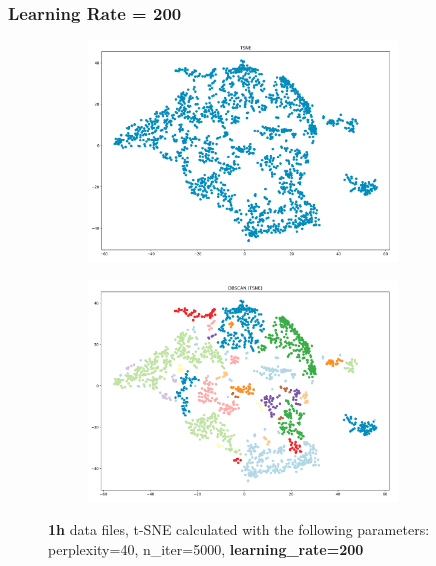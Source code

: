 \subsubsection{Learning Rate = 200}
\begin{figure}[H]
  \centering
  \begin{subfigure}{.5\textwidth}
    \centering
    \includegraphics[width=0.9\textwidth]{./images/tsneParametersTest/learningRate/lr200-1hTSNE.png}
  \end{subfigure}%
  \begin{subfigure}{.5\textwidth}
    \centering
    \includegraphics[width=0.9\textwidth]{./images/tsneParametersTest/learningRate/lr200-1hDBSCAN.png}
  \end{subfigure}
	\caption{\textbf{1h} data files, t-SNE calculated with the following parameters: perplexity=40, n\_iter=5000, \textbf{learning\_rate=200}}
	\label{figure:1hlr200TSNE}
\end{figure}

